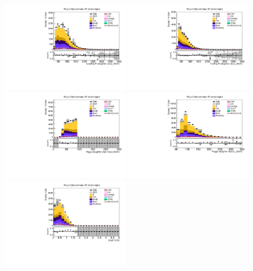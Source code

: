 \begin{figure}[tbp]
  \begin{center}
    \includegraphics[width=0.48\textwidth]{figures/wlnhbb2016/resolved/WmnWHHeavyFlavorCRLowMass_Hbjet1Pt.pdf}
    \includegraphics[width=0.48\textwidth]{figures/wlnhbb2016/resolved/WmnWHHeavyFlavorCRLowMass_Hbjet2Pt.pdf}
    \includegraphics[width=0.48\textwidth]{figures/wlnhbb2016/resolved/WmnWHHeavyFlavorCRLowMass_mH.pdf}
    \includegraphics[width=0.48\textwidth]{figures/wlnhbb2016/resolved/WmnWHHeavyFlavorCRLowMass_pTH.pdf}
    \includegraphics[width=0.48\textwidth]{figures/wlnhbb2016/resolved/WmnWHHeavyFlavorCRLowMass_dEtab1b2.pdf}

\end{center}
\end{figure}

